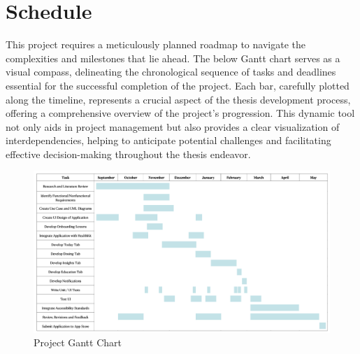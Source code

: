 \chapter{Schedule}

This project requires a meticulously planned roadmap to navigate the complexities and milestones that lie ahead. The below Gantt chart serves as a visual compass, delineating the chronological sequence of tasks and deadlines essential for the successful completion of the project. Each bar, carefully plotted along the timeline, represents a crucial aspect of the thesis development process, offering a comprehensive overview of the project's progression. This dynamic tool not only aids in project management but also provides a clear visualization of interdependencies, helping to anticipate potential challenges and facilitating effective decision-making throughout the thesis endeavor.

\begin{figure} [H]
    \centering
    \includegraphics[width=1\linewidth]{thesis//chapters//images/ganttChart.png}
    \caption{Project Gantt Chart}
    \label{fig:project-gantt-chart}
\end{figure}

